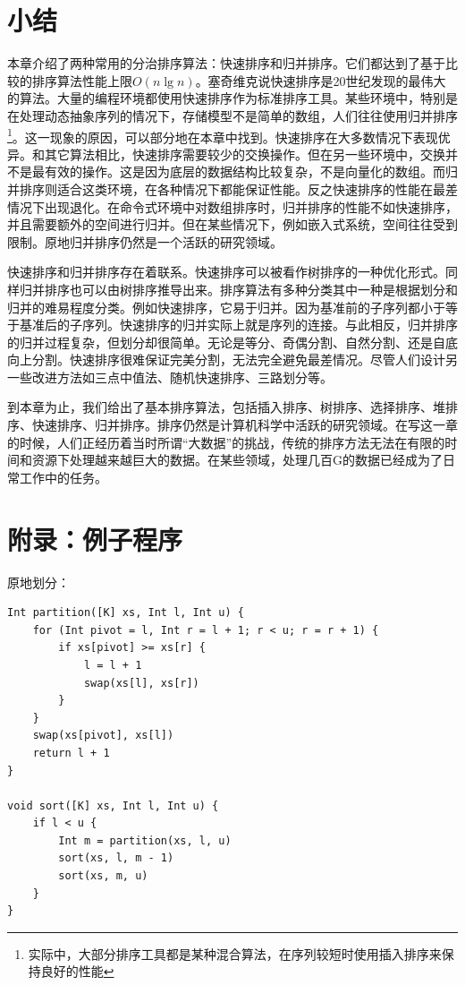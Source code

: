\documentclass[b5paper]{ctexart}
\begin{document}
\section{小结}

本章介绍了两种常用的分治排序算法：快速排序和归并排序。它们都达到了基于比较的排序算法性能上限$O(n \lg n)$。塞奇维克说快速排序是20世纪发现的最伟大的算法。大量的编程环境都使用快速排序作为标准排序工具。某些环境中，特别是在处理动态抽象序列的情况下，存储模型不是简单的数组，人们往往使用归并排序\footnote{实际中，大部分排序工具都是某种混合算法，在序列较短时使用插入排序来保持良好的性能}。这一现象的原因，可以部分地在本章中找到。快速排序在大多数情况下表现优异。和其它算法相比，快速排序需要较少的交换操作。但在另一些环境中，交换并不是最有效的操作。这是因为底层的数据结构比较复杂，不是向量化的数组。而归并排序则适合这类环境，在各种情况下都能保证性能。反之快速排序的性能在最差情况下出现退化。在命令式环境中对数组排序时，归并排序的性能不如快速排序，并且需要额外的空间进行归并。但在某些情况下，例如嵌入式系统，空间往往受到限制。原地归并排序仍然是一个活跃的研究领域。

快速排序和归并排序存在着联系。快速排序可以被看作树排序的一种优化形式。同样归并排序也可以由树排序推导出来\cite{sort-deriving}。排序算法有多种分类\cite{TAOCP}其中一种是根据划分和归并的难易程度分类\cite{algo-fp}。例如快速排序，它易于归并。因为基准前的子序列都小于等于基准后的子序列。快速排序的归并实际上就是序列的连接。与此相反，归并排序的归并过程复杂，但划分却很简单。无论是等分、奇偶分割、自然分割、还是自底向上分割。快速排序很难保证完美分割，无法完全避免最差情况。尽管人们设计另一些改进方法如三点中值法、随机快速排序、三路划分等。

到本章为止，我们给出了基本排序算法，包括插入排序、树排序、选择排序、堆排序、快速排序、归并排序。排序仍然是计算机科学中活跃的研究领域。在写这一章的时候，人们正经历着当时所谓“大数据”的挑战，传统的排序方法无法在有限的时间和资源下处理越来越巨大的数据。在某些领域，处理几百G的数据已经成为了日常工作中的任务。

\begin{Exercise}
\end{Exercise}

\section{附录：例子程序}

原地划分：

\begin{lstlisting}[language = Bourbaki]
Int partition([K] xs, Int l, Int u) {
    for (Int pivot = l, Int r = l + 1; r < u; r = r + 1) {
        if xs[pivot] >= xs[r] {
            l = l + 1
            swap(xs[l], xs[r])
        }
    }
    swap(xs[pivot], xs[l])
    return l + 1
}

void sort([K] xs, Int l, Int u) {
    if l < u {
        Int m = partition(xs, l, u)
        sort(xs, l, m - 1)
        sort(xs, m, u)
    }
}
\end{lstlisting}
\end{document}
